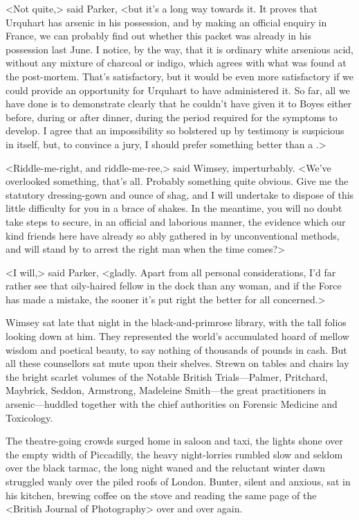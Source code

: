 <Not quite,> said Parker, <but it's a long way towards it. It proves that Urquhart has arsenic in his possession, and by making an official enquiry in France, we can probably find out whether this packet was already in his possession last June. I notice, by the way, that it is ordinary white arsenious acid, without any mixture of charcoal or indigo, which agrees with what was found at the post-mortem. That's satisfactory, but it would be even more satisfactory if we could provide an opportunity for Urquhart to have administered it. So far, all we have done is to demonstrate clearly that he couldn't have given it to Boyes either before, during or after dinner, during the period required for the symptoms to develop. I agree that an impossibility so bolstered up by testimony is suspicious in itself, but, to convince a jury, I should prefer something better than a .>

<Riddle-me-right, and riddle-me-ree,> said Wimsey, imperturbably. <We've overlooked something, that's all. Probably something quite obvious. Give me the statutory dressing-gown and ounce of shag, and I will undertake to dispose of this little difficulty for you in a brace of shakes. In the meantime, you will no doubt take steps to secure, in an official and laborious manner, the evidence which our kind friends here have already so ably gathered in by unconventional methods, and will stand by to arrest the right man when the time comes?>

<I will,> said Parker, <gladly. Apart from all personal considerations, I'd far rather see that oily-haired fellow in the dock than any woman, and if the Force has made a mistake, the sooner it's put right the better for all concerned.>

\divider

Wimsey sat late that night in the black-and-primrose library, with the tall folios looking down at him. They represented the world's accumulated hoard of mellow wisdom and poetical beauty, to say nothing of thousands of pounds in cash. But all these counsellors sat mute upon their shelves. Strewn on tables and chairs lay the bright scarlet volumes of the Notable British Trials—Palmer, Pritchard, Maybrick, Seddon, Armstrong, Madeleine Smith—the great practitioners in arsenic—huddled together with the chief authorities on Forensic Medicine and Toxicology.

The theatre-going crowds surged home in saloon and taxi, the lights shone over the empty width of Piccadilly, the heavy night-lorries rumbled slow and seldom over the black tarmac, the long night waned and the reluctant winter dawn struggled wanly over the piled roofs of London. Bunter, silent and anxious, sat in his kitchen, brewing coffee on the stove and reading the same page of the <British Journal of Photography> over and over again.

